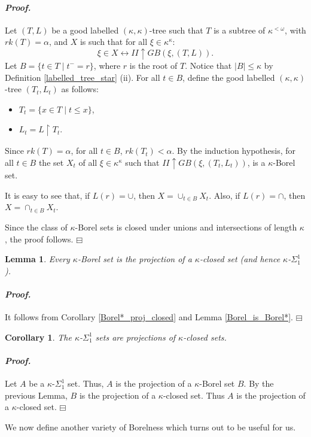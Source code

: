 \documentclass[12pt,a4paper]{amsart}
\newtheorem{lemma}[thm]{Lemma}
\newtheorem{cor}[thm]{Corollary}
\theoremstyle{definition}
\theoremstyle{remark}
\renewcommand{\mid}{\mathrel{|}\allowbreak}
\renewcommand{\restriction}{\mathbin\upharpoonright}
\newenvironment{cproof}{\paragraph{\emph{Proof.\,}}}{\hfill{$\boxminus$}\par\vspace{2mm}}
\begin{document}
\begin{cproof}
Let $(T,L)$ be a  good labelled $(\kappa,\kappa)$-tree  such that $T$ is a subtree of $\kappa^{<\omega}$, with $rk(T)=\alpha$, and $X$ is such that for all $\xi\in\kappa^\kappa$: 
$$\xi\in X\leftrightarrow II\uparrow GB(\xi,(T,L)).$$ Let $B=\{t\in T\mid t^-=r\}$, where $r$ is the root of $T$. Notice that $|B|\leq \kappa$ by Definition \ref{labelled_tree_star} (ii).
For all $t\in B$, define the good labelled $(\kappa,\kappa)$-tree $(T_t,L_t)$ as follows:
\begin{itemize}
    \item $T_t=\{x\in T\mid t\leq x\}$,
    \item $L_t=L\restriction T_t$.
\end{itemize}
Since $rk(T)=\alpha$, for all $t\in B$, $rk(T_t)<\alpha$. By the induction hypothesis, for all $t\in B$ the set $X_t$ of all $\xi\in\kappa^\kappa$ such that 
$II\uparrow GB(\xi,(T_t,L_t))$, is a $\kappa$-Borel set.

It is easy to see that, if $L(r)=\cup$, then $X=\cup_{t\in B}X_t$. Also, if $L(r)=\cap$, then $X=\cap_{t\in B}X_t$.

Since the class of $\kappa$-Borel sets is closed under unions and intersections of length $\kappa$, the proof follows. 
\end{cproof}
\begin{lemma}
    Every $\kappa$-Borel set is the projection of a $\kappa$-closed set (and hence $\kappa$-$\Sigma^1_1$).
\end{lemma}
\begin{cproof}
It follows from Corollary \ref{Borel*_proj_closed} and Lemma \ref{Borel_is_Borel*}.
\end{cproof}

\begin{cor} The
    $\kappa$-$\Sigma^1_1$ sets are projections of $\kappa$-closed sets.
\end{cor}

\begin{cproof}
    Let $A$ be a $\kappa$-$\Sigma_1^1$ set. Thus, $A$ is the projection of a $\kappa$-Borel set $B$. By the previous Lemma, $B$ is the projection of a $\kappa$-closed set. Thus $A$ is the projection of a $\kappa$-closed set.
\end{cproof}

We now define another variety of Borelness which turns out to be useful for us. 
\end{document}
